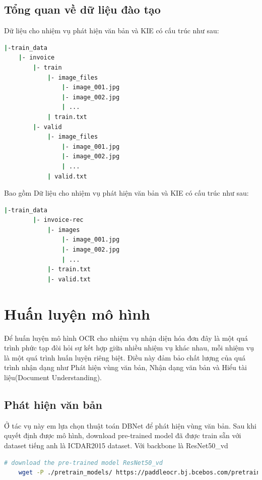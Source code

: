 \subsection{Tổng quan về dữ liệu đào tạo}
Dữ liệu cho nhiệm vụ phát hiện văn bản và KIE có cấu trúc như sau:
\begin{lstlisting}[language=bash]
|-train_data
    |- invoice
        |- train
            |- image_files
                |- image_001.jpg
                |- image_002.jpg
                | ...
            | train.txt
        |- valid
            |- image_files
                |- image_001.jpg
                |- image_002.jpg
                | ...
            | valid.txt  
\end{lstlisting}

Bao gồm 
Dữ liệu cho nhiệm vụ phát hiện văn bản và KIE có cấu trúc như sau:
\begin{lstlisting}[language=bash]
    |-train_data
        |- invoice-rec
            |- images
                |- image_001.jpg
                |- image_002.jpg
                | ...
            |- train.txt
            |- valid.txt
    \end{lstlisting}

\section{Huấn luyện mô hình}
Để huấn luyện mô hình OCR cho nhiệm vụ nhận diện hóa đơn đây là một quá trình phức tạp đòi hỏi sự kết hợp giữa nhiều nhiệm vụ khác nhau, mỗi nhiệm vụ là một quá trình huấn luyện riêng biệt. Điều này đảm bảo chất lượng của quá trình nhận dạng như Phát hiện vùng văn bản, Nhận dạng văn bản và Hiểu tài liệu(Document Understanding).

\subsection{Phát hiện văn bản}
Ở tác vụ này em lựa chọn thuật toán DBNet để phát hiện vùng văn bản. Sau khi quyết định được mô hình, download pre-trained model đã được train sẵn với dataset tiếng anh là ICDAR2015 dataset. Với backbone là ResNet50\_vd
\begin{lstlisting}[language=bash]
    # download the pre-trained model ResNet50_vd
    wget -P ./pretrain_models/ https://paddleocr.bj.bcebos.com/pretrained/ResNet50_vd_ssld_pretrained.pdparams
\end{lstlisting}

